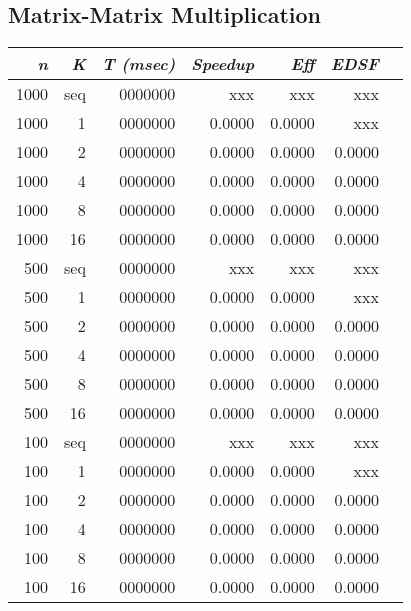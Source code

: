 \documentclass{dependencies/acm_proc_article-sp}
\begin{document}
\subsection{Matrix-Matrix Multiplication}

\begin{center}
\begin{tabular}{|r|r|r|r|r|r|r|}\hline
{\em n} & {\em K} & {\em T (msec)} & {\em Speedup} & {\em Eff} & {\em EDSF} \\\hline
1000    & seq     & 0000000        &   xxx         & xxx       & xxx        \\\hline
1000    & 1       & 0000000        & 0.0000        & 0.0000    & xxx        \\\hline
1000    & 2       & 0000000        & 0.0000        & 0.0000    & 0.0000     \\\hline
1000    & 4       & 0000000        & 0.0000        & 0.0000    & 0.0000     \\\hline
1000    & 8       & 0000000        & 0.0000        & 0.0000    & 0.0000     \\\hline
1000    & 16      & 0000000        & 0.0000        & 0.0000    & 0.0000     \\\hline
500     & seq     & 0000000        &   xxx         & xxx       & xxx        \\\hline
500     & 1       & 0000000        & 0.0000        & 0.0000    & xxx        \\\hline
500     & 2       & 0000000        & 0.0000        & 0.0000    & 0.0000     \\\hline
500     & 4       & 0000000        & 0.0000        & 0.0000    & 0.0000     \\\hline
500     & 8       & 0000000        & 0.0000        & 0.0000    & 0.0000     \\\hline
500     & 16      & 0000000        & 0.0000        & 0.0000    & 0.0000     \\\hline
100     & seq     & 0000000        &   xxx         & xxx       & xxx        \\\hline
100     & 1       & 0000000        & 0.0000        & 0.0000    & xxx        \\\hline
100     & 2       & 0000000        & 0.0000        & 0.0000    & 0.0000     \\\hline
100     & 4       & 0000000        & 0.0000        & 0.0000    & 0.0000     \\\hline
100     & 8       & 0000000        & 0.0000        & 0.0000    & 0.0000     \\\hline
100     & 16      & 0000000        & 0.0000        & 0.0000    & 0.0000     \\\hline
\end{tabular}
\end{center}
\end{document}
